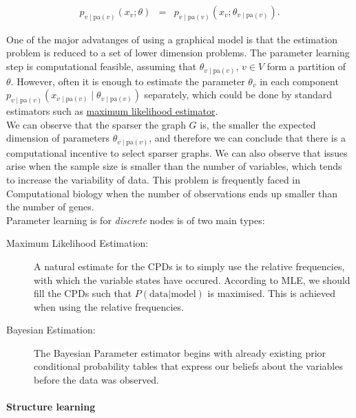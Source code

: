 \begin{eqnarray*}
p_{v\mid \text{pa}(v)}(x_{v};\theta) &=& p_{v\mid \text{pa}(v)}(x_v;\theta_{v\mid \text{pa}(v)}).
\end{eqnarray*}

One of the major advatanges of using a graphical model is that the estimation problem is reduced to a set of lower dimension problems. The parameter learning step is computational feasible, assuming that $\theta_{v\mid \text{pa}(v)}$, $v\in V$ form a partition of $\theta$.  However, often it is enough to estimate the parameter $\theta_v$ in each component $p_{v\mid \text{pa}(v)}(x_{v\mid \text{pa}(v)}\mid \theta_{v\mid \text{pa}(v)})$ separately, which could be done by standard estimators such as \hyperref[mle]{maximum likelihood estimator}.\\

We can observe that the sparser the graph $G$ is, the smaller the expected dimension of parameters $\theta_{v\mid \text{pa}(v)}$, and therefore we can conclude that there is a computational incentive to select sparser graphs. We can also observe that issues arise when the sample size is smaller than the number of variables, which tends to increase the variability of data. This problem is frequently faced in Computational biology when the number of observations ends up smaller than the number of genes.\\

Parameter learning is for \textit{discrete} nodes is of two main types:

\begin{description}
		\item[Maximum Likelihood Estimation:]{\label{mlw} A natural estimate for the CPDs is to simply use the relative frequencies, with which the variable states have occured. According to MLE, we should fill the CPDs such that $P(\text{data}|\text{model})$ is maximised. This is achieved when using the relative frequencies\cite{875348}.}
		\item[Bayesian Estimation:]{The Bayesian Parameter estimator begins with already existing prior conditional probability tables that express our beliefs about the variables before the data was observed. }
\end{description}

\paragraph{Structure learning}
\label{structure}

